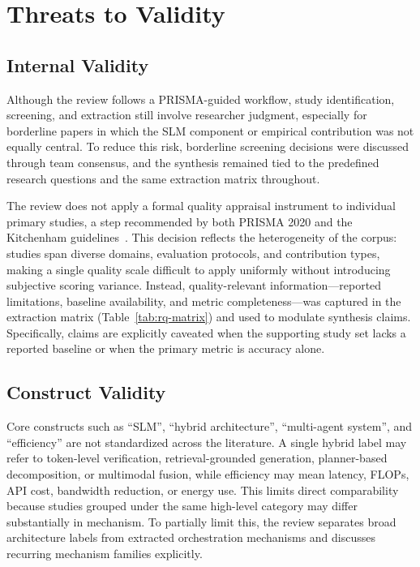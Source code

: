 \section{Threats to Validity}
\label{sec:threats}

\subsection{Internal Validity}

Although the review follows a PRISMA-guided workflow, study identification, screening, and extraction still involve researcher judgment, especially for borderline papers in which the SLM component or empirical contribution was not equally central. To reduce this risk, borderline screening decisions were discussed through team consensus, and the synthesis remained tied to the predefined research questions and the same extraction matrix throughout.

The review does not apply a formal quality appraisal instrument to individual primary studies, a step recommended by both PRISMA 2020 and the Kitchenham guidelines~\cite{kitchenham2007guidelines}. This decision reflects the heterogeneity of the corpus: studies span diverse domains, evaluation protocols, and contribution types, making a single quality scale difficult to apply uniformly without introducing subjective scoring variance. Instead, quality-relevant information---reported limitations, baseline availability, and metric completeness---was captured in the extraction matrix (Table~\ref{tab:rq-matrix}) and used to modulate synthesis claims. Specifically, claims are explicitly caveated when the supporting study set lacks a reported baseline or when the primary metric is accuracy alone.

\subsection{Construct Validity}

Core constructs such as ``SLM'', ``hybrid architecture'', ``multi-agent system'', and ``efficiency'' are not standardized across the literature. A single hybrid label may refer to token-level verification, retrieval-grounded generation, planner-based decomposition, or multimodal fusion, while efficiency may mean latency, FLOPs, API cost, bandwidth reduction, or energy use. This limits direct comparability because studies grouped under the same high-level category may differ substantially in mechanism. To partially limit this, the review separates broad architecture labels from extracted orchestration mechanisms and discusses recurring mechanism families explicitly.

